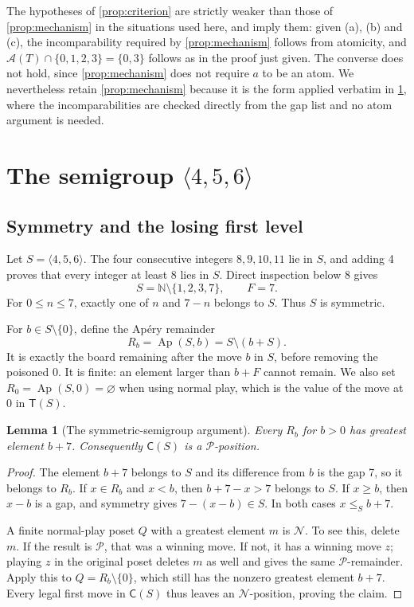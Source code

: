 \documentclass[11pt,letterpaper]{article}
\numberwithin{equation}{section}
\newtheorem{lemma}[theorem]{Lemma}
\theoremstyle{definition}
\theoremstyle{remark}
\newcommand{\N}{\mathbb N}
\newcommand{\opt}{\mathcal A}
\newcommand{\Ap}{\operatorname{Ap}}
\newcommand{\Ch}{\mathsf C}
\newcommand{\Norm}{\mathsf T}
\newcommand{\Pout}{\mathcal P}
\newcommand{\Nout}{\mathcal N}
\begin{document}
The hypotheses of \cref{prop:criterion} are strictly weaker than those of
\cref{prop:mechanism} in the situations used here, and imply them: given
(a), (b) and (c), the incomparability required by \cref{prop:mechanism}
follows from atomicity, and
$\opt(T)\cap\{0,1,2,3\}=\{0,3\}$ follows as in the proof just given.
The converse does not hold, since \cref{prop:mechanism} does not require
$a$ to be an atom. We nevertheless retain \cref{prop:mechanism} because
it is the form applied verbatim in \cref{sec:semigroup}, where the
incomparabilities are checked directly from the gap list and no atom
argument is needed.

\section{The semigroup \texorpdfstring{$\langle4,5,6\rangle$}{<4,5,6>}}
\label{sec:semigroup}

\subsection{Symmetry and the losing first level}

Let $S=\langle4,5,6\rangle$. The four consecutive integers
$8,9,10,11$ lie in $S$, and adding 4 proves that every integer at
least 8 lies in $S$. Direct inspection below 8 gives
\begin{equation}\label{eq:gaps456}
 S=\N\setminus\{1,2,3,7\},\qquad F=7.
\end{equation}
For $0\leq n\leq7$, exactly one of $n$ and $7-n$ belongs to $S$.
Thus $S$ is symmetric.

For $b\in S\setminus\{0\}$, define the Ap\'ery remainder
\begin{equation}\label{eq:apery}
 R_b=\Ap(S,b)=S\setminus(b+S).
\end{equation}
It is exactly the board remaining after the move $b$ in $S$, before
removing the poisoned 0. It is finite: an element larger than $b+F$
cannot remain. We also set $R_0=\Ap(S,0)=\varnothing$ when using normal
play, which is the value of the move at 0 in $\Norm(S)$.

\begin{lemma}[The symmetric-semigroup argument]\label{lem:symmetric}
Every $R_b$ for $b>0$ has greatest element $b+7$. Consequently
$\Ch(S)$ is a $\Pout$-position.
\end{lemma}
\begin{proof}
The element $b+7$ belongs to $S$ and its difference from $b$ is the
gap 7, so it belongs to $R_b$. If $x\in R_b$ and $x<b$, then
$b+7-x>7$ belongs to $S$. If $x\geq b$, then $x-b$ is a gap,
and symmetry gives $7-(x-b)\in S$. In both cases $x\leq_S b+7$.

A finite normal-play poset $Q$ with a greatest element $m$ is
$\Nout$. To see this, delete $m$. If the result is $\Pout$, that
was a winning move. If not, it has a winning move $z$; playing $z$
in the original poset deletes $m$ as well and gives the same
$\Pout$-remainder. Apply this to $Q=R_b\setminus\{0\}$, which
still has the nonzero greatest element $b+7$. Every legal first
move in $\Ch(S)$ thus leaves an $\Nout$-position, proving the claim.
\end{proof}
\end{document}
